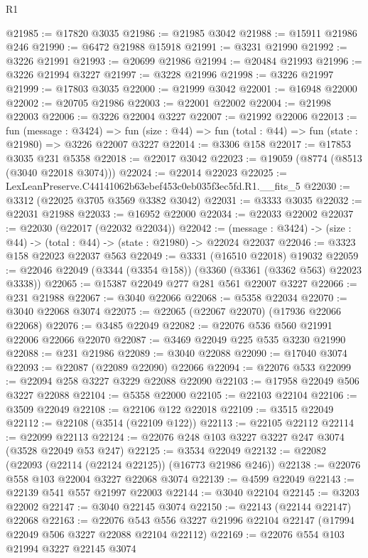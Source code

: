 \begin{lexlean}{R1}
\begin{coremodule}
@21985 := @17820 @3035
@21986 := @21985 @3042
@21988 := @15911 @21986 @246
@21990 := @6472 @21988 @15918
@21991 := @3231 @21990
@21992 := @3226 @21991
@21993 := @20699 @21986
@21994 := @20484 @21993
@21996 := @3226 @21994 @3227
@21997 := @3228 @21996
@21998 := @3226 @21997
@21999 := @17803 @3035
@22000 := @21999 @3042
@22001 := @16948 @22000
@22002 := @20705 @21986
@22003 := @22001 @22002
@22004 := @21998 @22003
@22006 := @3226 @22004 @3227
@22007 := @21992 @22006
@22013 := fun (message : @3424) =>
  fun (size : @44) => fun (total : @44) => fun (state : @21980) => @3226 @22007 @3227
@22014 := @3306 @158
@22017 := @17853 @3035 @231 @5358
@22018 := @22017 @3042
@22023 := @19059 (@8774 (@8513 (@3040 @22018 @3074)))
@22024 := @22014 @22023
@22025 := LexLeanPreserve.C44141062b63ebef453c0eb035f3ec5fd.R1.__fits_5
@22030 := @3312 (@22025 @3705 @3569 @3382 @3042)
@22031 := @3333 @3035
@22032 := @22031 @21988
@22033 := @16952 @22000
@22034 := @22033 @22002
@22037 := @22030 (@22017 (@22032 @22034))
@22042 := (message : @3424) -> (size : @44) -> (total : @44) -> (state : @21980) -> @22024 @22037
@22046 := @3323 @158 @22023 @22037 @563
@22049 := @3331 (@16510 @22018) @19032
@22059 := @22046 @22049 (@3344 (@3354 @158)) (@3360 (@3361 (@3362 @563) @22023 @3338))
@22065 := @15387 @22049 @277 @281 @561 @22007 @3227
@22066 := @231 @21988
@22067 := @3040 @22066
@22068 := @5358 @22034
@22070 := @3040 @22068 @3074
@22075 := @22065 (@22067 @22070) (@17936 @22066 @22068)
@22076 := @3485 @22049
@22082 := @22076 @536 @560 @21991 @22006 @22066 @22070
@22087 := @3469 @22049 @225 @535 @3230 @21990
@22088 := @231 @21986
@22089 := @3040 @22088
@22090 := @17040 @3074
@22093 := @22087 (@22089 @22090) @22066
@22094 := @22076 @533
@22099 := @22094 @258 @3227 @3229 @22088 @22090
@22103 := @17958 @22049 @506 @3227 @22088
@22104 := @5358 @22000
@22105 := @22103 @22104
@22106 := @3509 @22049
@22108 := @22106 @122 @22018
@22109 := @3515 @22049
@22112 := @22108 (@3514 (@22109 @122))
@22113 := @22105 @22112
@22114 := @22099 @22113
@22124 := @22076 @248 @103 @3227 @3227 @247 @3074 (@3528 @22049 @53 @247)
@22125 := @3534 @22049
@22132 := @22082 (@22093 (@22114 (@22124 @22125)) (@16773 @21986 @246))
@22138 := @22076 @558 @103 @22004 @3227 @22068 @3074
@22139 := @4599 @22049
@22143 := @22139 @541 @557 @21997 @22003
@22144 := @3040 @22104
@22145 := @3203 @22002
@22147 := @3040 @22145 @3074
@22150 := @22143 (@22144 @22147) @22068
@22163 := @22076
    @543
    @556
    @3227
    @21996
    @22104
    @22147
    (@17994 @22049 @506 @3227 @22088 @22104 @22112)
@22169 := @22076 @554 @103 @21994 @3227 @22145 @3074

\end{coremodule}
\end{lexlean}

